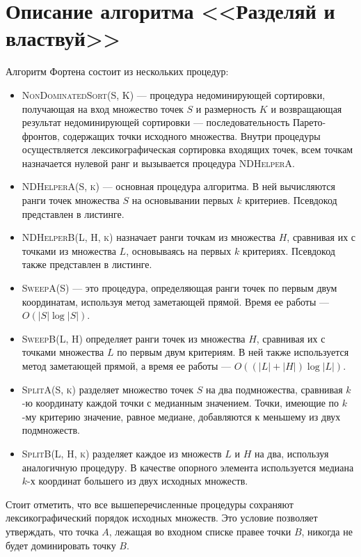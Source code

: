 \section{Описание алгоритма <<Разделяй и властвуй>>}
Алгоритм Фортена состоит из нескольких процедур:
\begin{itemize}
    \item \textsc{NonDominatedSort(S, K)} --- процедура недоминирующей сортировки, получающая на вход множество точек $S$ и размерность $K$ и возвращающая результат недоминирующей сортировки --- последовательность Парето-фронтов, содержащих точки исходного множества.
Внутри процедуры осуществляется лексикографическая сортировка входящих точек, всем точкам назначается нулевой ранг и вызывается процедура \textsc{NDHelperA}.
    \item \textsc{NDHelperA(S, k)} --- основная процедура алгоритма. В ней вычисляются ранги точек множества $S$ на основывании первых $k$ критериев. Псевдокод представлен в листинге.
    \item \textsc{NDHelperB(L, H, k)} назначает ранги точкам из множества $H$, сравнивая их с точками из множества $L$, основываясь на первых $k$ критериях. Псевдокод также представлен в листинге.
    \item \textsc{SweepA(S)} --- это процедура, определяющая ранги точек по первым двум координатам, используя метод заметающей прямой. Время ее работы --- $O(|S|\log|S|)$.
    \item \textsc{SweepB(L, H)} определяет ранги точек из множества $H$, сравнивая их с точками множества $L$ по первым двум критериям. В ней также используется метод заметающей прямой, а время ее работы --- $O((|L| + |H|)\log{|L|})$.
    \item \textsc{SplitA(S, k)} разделяет множество точек $S$ на два подмножества, сравнивая $k$-ю координату каждой точки с медианным значением. Точки, имеющие по $k$-му критерию значение, равное медиане, добавляются к меньшему из двух подмножеств.
    \item \textsc{SplitB(L, H, k)} разделяет каждое из множеств $L$ и $H$ на два, используя аналогичную процедуру. В качестве опорного элемента используется медиана $k$-х координат большего из двух исходных множеств.
\end{itemize}

Стоит отметить, что все вышеперечисленные процедуры сохраняют лексикографический порядок исходных множеств.
Это условие позволяет утверждать, что точка $A$, лежащая во входном списке правее точки $B$, никогда не будет доминировать точку $B$.

